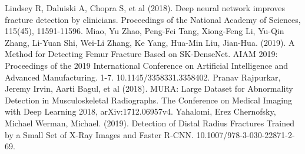 \documentclass[12pt,oneside,a4paper]{article}
\begin{document}
\begin{thebibliography}{99}
Lindsey  R,  Daluiski  A,  Chopra  S,  et al  (2018).  Deep  neural  network  improves fracture  detection  by  clinicians.  Proceedings  of  the  National  Academy  of Sciences, 115(45), 11591-11596.  
 Miao, Yu Zhao, Peng-Fei Tang, Xiong-Feng Li, Yu-Qin Zhang, Li-Yuan Shi, Wei-Li Zhang, Ke Yang, Hua-Min Liu, Jian-Hua. (2019). A Method for Detecting Femur Fracture Based on SK-DenseNet. AIAM 2019: Proceedings of the 2019 International Conference on Artificial Intelligence and Advanced Manufacturing. 1-7. 10.1145/3358331.3358402. 
 Pranav Rajpurkar, Jeremy Irvin, Aarti Bagul, et al (2018). MURA: Large Dataset for Abnormality Detection in Musculoskeletal Radiographs. The Conference on Medical Imaging with Deep Learning 2018, arXiv:1712.06957v4. 
 Yahalomi, Erez Chernofsky, Michael Werman, Michael. (2019). Detection of Distal Radius Fractures Trained by a Small Set of X-Ray Images and Faster R-CNN. 10.1007/978-3-030-22871-2-69. 



\end{thebibliography}
\end{document}
